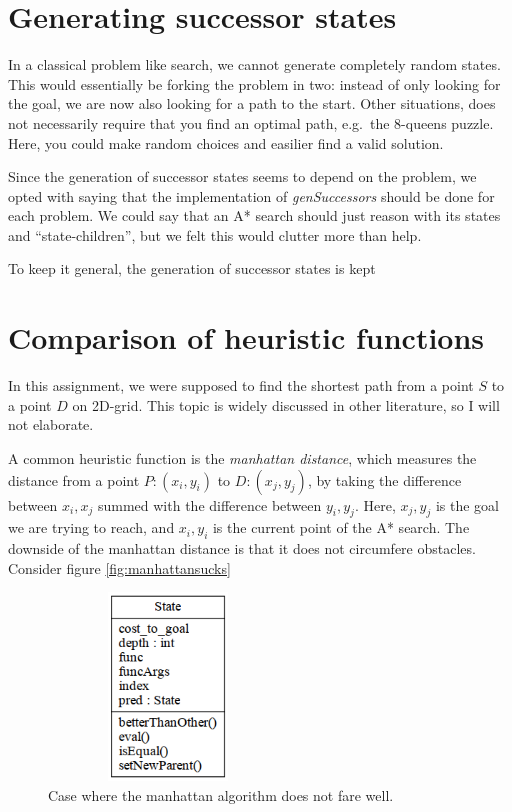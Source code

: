 \documentclass[journal]{IEEEtran}
\begin{document}
\section{Generating successor states}
In a classical problem like search, we cannot generate completely random
states. This would essentially be forking the problem in two: instead of only
looking for the goal, we are now also looking for a path to the start.
Other situations, does not necessarily require that you find an optimal path,
e.g.\ the 8-queens puzzle. Here, you could make random choices and easilier
find a valid solution.

Since the generation of successor states seems to depend on the problem, we
opted with saying that the implementation of \textit{genSuccessors} should be done
for each problem. We could say that an A* search should just reason 
with its states and ``state-children'', but we felt this would clutter
more than help.

To keep it general, the generation of successor states is kept



\section{Comparison of heuristic functions}
In this assignment, we were supposed to find the shortest path
from a point $S$ to a point $D$ on 2D-grid. This topic is widely discussed in other
literature, so I will not elaborate.

A common heuristic function is the \textit{manhattan distance}, which measures the 
distance from a point $P: (x_{i},y_{i})$ to $D: (x_{j},y_{j})$, by taking the difference
between $x_i, x_j$ summed with the difference between $y_i, y_j$. Here, $x_j,y_j$ is 
the goal we are trying to reach, and $x_i, y_i$  is the current point of the A*
search.
The downside of the manhattan distance is that it does not circumfere obstacles.
Consider figure \autoref{fig:manhattansucks}

\begin{figure}[Hb]
\centering
\includegraphics[height=5cm,keepaspectratio,width=2.5in]{fig/problem.png}%
\caption{Case where the manhattan algorithm does not fare well.}
\label{fig:manhattansucks}
\end{figure}
\end{document}
